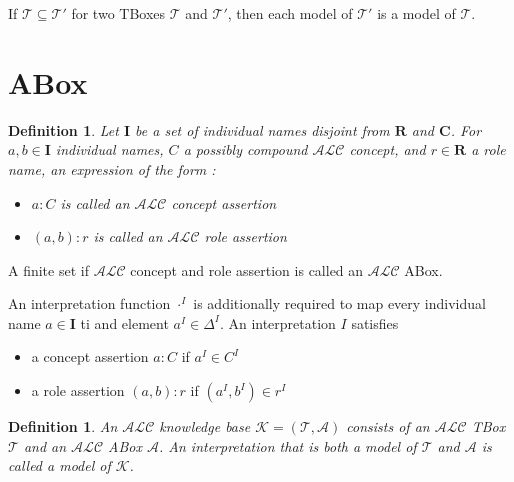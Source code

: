 \documentclass[a4paper,11pt]{report}
\newcommand*{\alc}{$\mathcal{ALC}$ }
\newcommand*{\tb}{\mathcal{T}}
\newcommand*{\ab}{\mathcal{A}}
\begin{document}
\begin{Lemma}
  If $\tb \subseteq \tb'$ for two TBoxes $\tb$ and $\tb'$, then each model of
  $\tb'$ is a model of $\tb$.
\end{Lemma}

\section{ABox}

\newtheorem{ABOX}{Definition}[section]
\begin{ABOX}
  Let $\mathbf{I}$ be a set of \textit{individual names} disjoint from
  $\mathbf{R}$ and $\mathbf{C}$. For $a,b \in \mathbf{I}$ individual names, $C$
  a possibly compound \alc concept, and $r \in \mathbf{R}$ a role name, an
  expression of the form :
  \begin{itemize}
  \item $a : C$ is called an \alc concept assertion
  \item $(a,b) :r$ is called an \alc role assertion
  \end{itemize}
\end{ABOX}

A finite set if \alc concept and role assertion is called an \alc ABox.

An interpretation function $\cdot^I$ is additionally required to map every
individual name $a\in \mathbf{I}$ ti and element $a^I \in \Delta^I$. An
interpretation $I$ satisfies
\begin{itemize}
\item a concept assertion $a:C$ if $a^I \in C^I$
\item a role assertion $(a,b) : r$ if $(a^I,b^I) \in r^I$
\end{itemize}

\newtheorem{KB}{Definition}[section]
\begin{KB}
  An \alc \textit{knowledge base} $\mathcal{K} = (\mathcal{T},\mathcal{A})$
  consists of an \alc TBox $\tb$ and an \alc ABox $\ab$. An interpretation that
  is both a model of $\tb$ and $\ab$ is called a model of $\mathcal{K}$.
\end{KB}
\end{document}
